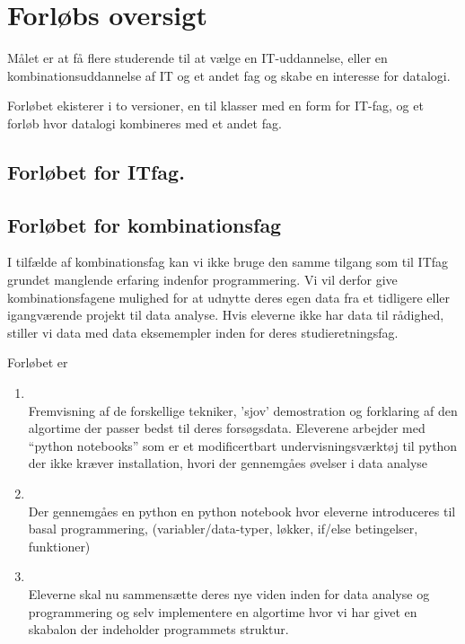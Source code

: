 \documentclass[11pt]{article}
\begin{document}
    \newpage                %
    \setcounter{page}{1}    %

\section{Forløbs oversigt}
    Målet er at få flere studerende til at vælge en IT-uddannelse, eller en
    kombinationsuddannelse af IT og et andet fag og skabe en interesse for datalogi.


    Forløbet ekisterer i to versioner, en til klasser med en form for IT-fag,
    og et forløb hvor datalogi kombineres med et andet fag.

    \subsection{Forløbet for ITfag. }

    \subsection{Forløbet for kombinationsfag}
    I tilfælde af kombinationsfag kan vi ikke bruge den samme tilgang som
    til ITfag grundet manglende erfaring indenfor programmering. Vi vil derfor
    give kombinationsfagene mulighed for at udnytte deres egen data fra et tidligere
    eller igangværende projekt til data analyse.
    Hvis eleverne ikke har data til rådighed, stiller vi data med data eksemempler inden
    for deres studieretningsfag.

    Forløbet er
    \begin{enumerate}
        \item {} ~ \\
        Fremvisning af de forskellige tekniker, 'sjov' demostration og forklaring af den
        algortime der passer bedst til deres forsøgsdata.
        Eleverene arbejder med ``python notebooks'' som er et modificertbart
        undervisningsværktøj til python der ikke kræver installation, hvori der gennemgåes
        øvelser i data analyse


        \item {} ~ \\
        Der gennemgåes en python en python notebook hvor eleverne introduceres til
        basal programmering, (variabler/data-typer, løkker, if/else betingelser, funktioner)


        \item {} ~ \\
        Eleverne skal nu sammensætte deres nye viden inden for data analyse og programmering
        og selv implementere en algortime hvor vi har givet en skabalon der indeholder
        programmets struktur.
    \end{enumerate}
\end{document}
